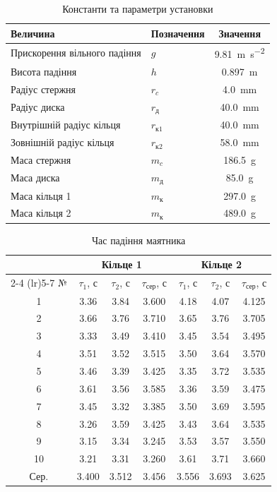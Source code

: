 \documentclass[ukrainian]{ucaphyslab}
\begin{document}
\begin{table}[H]
  \centering
  \begin{tabular}{@{}llc@{}}
    \toprule
    Величина & Позначення & Значення \\
    \midrule
    Прискорення вільного падіння & $g$ & \SI{9.81}{\meter\per\second\squared} \\
    Висота падіння & $h$ & \SI{0.897}{\meter} \\
    Радіус стержня & $r_c$ & \SI{4.0}{\milli\meter} \\
    Радіус диска & $r_\text{д}$ & \SI{40.0}{\milli\meter} \\
    Внутрішній радіус кільця & $r_{\text{к}1}$ & \SI{40.0}{\milli\meter} \\
    Зовнішній радіус кільця & $r_{\text{к}2}$ & \SI{58.0}{\milli\meter} \\
    Маса стержня & $m_c$ & \SI{186.5}{\gram} \\
    Маса диска & $m_\text{д}$ & \SI{85.0}{\gram} \\
    Маса кільця 1 & $m_\text{к}$ & \SI{297.0}{\gram} \\
    Маса кільця 2 & $m_\text{к}$ & \SI{489.0}{\gram} \\
    \bottomrule
  \end{tabular}
  \caption{Константи та параметри установки}
\end{table}

\begin{table}[H]
  \centering
  \begin{tabular}{@{}c ccc ccc@{}}
    \toprule
     & \multicolumn{3}{c}{Кільце 1} & \multicolumn{3}{c}{Кільце 2} \\
    \cmidrule(lr){2-4} \cmidrule(lr){5-7}
    № & $\tau_1$, с & $\tau_2$, с & $\tau_\text{сер}$, с & $\tau_1$, с & $\tau_2$, с & $\tau_\text{сер}$, с \\
    \midrule
    1  & 3.36 & 3.84 & 3.600 & 4.18 & 4.07 & 4.125 \\
    2  & 3.66 & 3.76 & 3.710 & 3.65 & 3.76 & 3.705 \\
    3  & 3.33 & 3.49 & 3.410 & 3.45 & 3.54 & 3.495 \\
    4  & 3.51 & 3.52 & 3.515 & 3.50 & 3.64 & 3.570 \\
    5  & 3.46 & 3.39 & 3.425 & 3.35 & 3.72 & 3.535 \\
    6  & 3.61 & 3.56 & 3.585 & 3.36 & 3.59 & 3.475 \\
    7  & 3.45 & 3.32 & 3.385 & 3.50 & 3.69 & 3.595 \\
    8  & 3.26 & 3.59 & 3.425 & 3.43 & 3.64 & 3.535 \\
    9  & 3.15 & 3.34 & 3.245 & 3.53 & 3.57 & 3.550 \\
    10 & 3.21 & 3.31 & 3.260 & 3.61 & 3.71 & 3.660 \\
    \midrule
    Сер. & 3.400 & 3.512 & 3.456 & 3.556 & 3.693 & 3.625 \\
    \bottomrule
  \end{tabular}
  \caption{Час падіння маятника}
\end{table}
\end{document}
